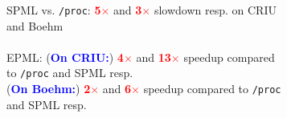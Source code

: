\documentclass[xcolor=table,bigger,unknownkeysallowed]{beamer}
\newcommand{\myemph}[1]{\textcolor{red}{\bf #1}}
\begin{document}
\begin{frame}
\begin{figure}[!h]
\begin{subfigure}[m]{.32\linewidth}
		\end{subfigure}		
		\hfill
		\begin{subfigure}[m]{.34\linewidth}
			SPML vs. \texttt{/proc}: \myemph{5$\times$} and \myemph{3$\times$} slowdown resp. on CRIU and Boehm	\\	
			~\\		
			\noindent EPML: (\textcolor{blue}{\bf On CRIU:}) \myemph{4$\times$} and \myemph{13$\times$} speedup compared to \texttt{/proc} and SPML resp.\\
			\noindent (\textcolor{blue}{\bf On Boehm:}) \myemph{2$\times$} and \myemph{6$\times$} speedup compared to \texttt{/proc} and SPML resp.
		\end{subfigure}	
	\end{figure}											
\end{frame}
			
\end{document}

